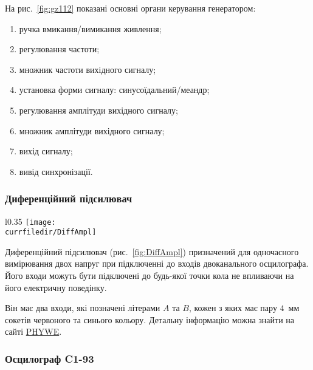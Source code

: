 На рис.~\ref{fig:gz112} показані основні органи керування генератором: 
\begin{enumerate}
    \item \label{btn:power} ручка вмикання/вимикання живлення;
    \item \label{btn:Hz} регулювання частоти; 
    \item \label{btn:HzMultiplier} множник частоти вихідного сигналу;
    \item \label{btn:sygnaltype} установка форми сигналу: синусоїдальний/меандр;
    \item \label{btn:dB} регулювання амплітуди вихідного сигналу; 
    \item \label{btn:dBMultiplier} множник амплітуди вихідного сигналу;  
    \item \label{btn:exit} вихід сигналу; 
    \item вивід синхронізації.
\end{enumerate}

\subsubsection*{Диференційний підсилювач}

\begin{wrapfigure}{l}{0.35\linewidth}\centering
    \texttt{[image: \\currfiledir/DiffAmpl]}
\caption{Диференційний підсилювач}
\label{fig:DiffAmpl}
\end{wrapfigure}%
Диференційний підсилювач (рис.~\ref{fig:DiffAmpl}) призначений для одночасного вимірювання двох напруг при підключенні до входів двоканального осцилографа. Його входи можуть бути підключені до будь-якої точки кола не впливаючи на його електричну поведінку.

Він має два входи, які позначені літерами $A$ та $B$, кожен з яких має пару $4$~мм сокетів червоного та синього кольору. Детальну інформацію можна знайти на сайті \href{https://www.phywe.com/en/difference-amplifier.html#tabs3}{PHYWE}.



\subsubsection*{Осцилограф C1-93}

